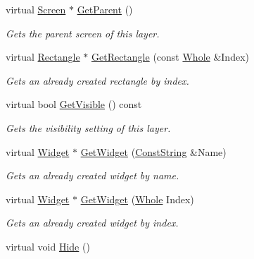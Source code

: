 \begin{DoxyCompactItemize}
virtual \hyperlink{classMezzanine_1_1UI_1_1Screen}{Screen} $\ast$ \hyperlink{classMezzanine_1_1UI_1_1Layer_a73d54e2ed5c8c63ad8d7cac8d29007c9}{GetParent} ()
\begin{DoxyCompactList}\small\item\em Gets the parent screen of this layer. \item\end{DoxyCompactList}\item 
virtual \hyperlink{classMezzanine_1_1UI_1_1Rectangle}{Rectangle} $\ast$ \hyperlink{classMezzanine_1_1UI_1_1Layer_af68871cb8f544227caa25ccc5666c944}{GetRectangle} (const \hyperlink{namespaceMezzanine_adcbb6ce6d1eb4379d109e51171e2e493}{Whole} \&Index)
\begin{DoxyCompactList}\small\item\em Gets an already created rectangle by index. \item\end{DoxyCompactList}\item 
virtual bool \hyperlink{classMezzanine_1_1UI_1_1Layer_a172eccc6e183ac05d1cff453de757a0f}{GetVisible} () const 
\begin{DoxyCompactList}\small\item\em Gets the visibility setting of this layer. \item\end{DoxyCompactList}\item 
virtual \hyperlink{classMezzanine_1_1UI_1_1Widget}{Widget} $\ast$ \hyperlink{classMezzanine_1_1UI_1_1Layer_a2d0ad533ccb60047f5cd0d24f2e7e377}{GetWidget} (\hyperlink{namespaceMezzanine_a63cd699ac54b73953f35ec9cfc05e506}{ConstString} \&Name)
\begin{DoxyCompactList}\small\item\em Gets an already created widget by name. \item\end{DoxyCompactList}\item 
virtual \hyperlink{classMezzanine_1_1UI_1_1Widget}{Widget} $\ast$ \hyperlink{classMezzanine_1_1UI_1_1Layer_a253eb9e18e213c2f1f9b3a9831e06a95}{GetWidget} (\hyperlink{namespaceMezzanine_adcbb6ce6d1eb4379d109e51171e2e493}{Whole} Index)
\begin{DoxyCompactList}\small\item\em Gets an already created widget by index. \item\end{DoxyCompactList}\item 
\hypertarget{classMezzanine_1_1UI_1_1Layer_ada49384da792711c08d75736acc720f5}{
virtual void \hyperlink{classMezzanine_1_1UI_1_1Layer_ada49384da792711c08d75736acc720f5}{Hide} ()}
\label{classMezzanine_1_1UI_1_1Layer_ada49384da792711c08d75736acc720f5}


\end{DoxyCompactItemize}
